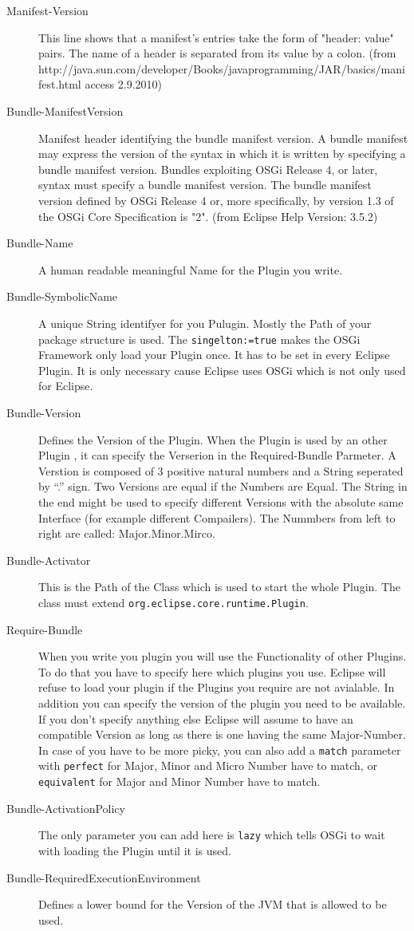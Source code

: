 \documentclass[a4paper,10pt]{report}
\begin{document}
\begin{description}
 \item[Manifest-Version] This line shows that a manifest's entries take the form of "header: value" pairs. The name of a header is separated from its value by a colon. (from http://java.sun.com/developer/Books/javaprogramming/JAR/basics/manifest.html access 2.9.2010)
 \item[Bundle-ManifestVersion] Manifest header identifying the bundle manifest version. A bundle manifest may express the version of the syntax in which it is written by specifying a bundle manifest version. Bundles exploiting OSGi Release 4, or later, syntax must specify a bundle manifest version. 
The bundle manifest version defined by OSGi Release 4 or, more specifically, by version 1.3 of the OSGi Core Specification is "2". (from Eclipse Help Version: 3.5.2)
 \item[Bundle-Name] A human readable meaningful Name for the Plugin you write.
 \item[Bundle-SymbolicName] A unique String identifyer for you Pulugin. Mostly the Path of your package structure is used. The \verb!singelton:=true! makes the OSGi Framework only load your Plugin once. It has to be set in every Eclipse Plugin. It is only necessary cause Eclipse uses OSGi which is not only used for Eclipse.
 \item[Bundle-Version] Defines the Version of the Plugin. When the Plugin is used by an other Plugin , it can specify the Verserion in the Required-Bundle Parmeter. A Verstion is composed of 3 positive natural numbers and a String seperated by ``.'' sign. Two Versions are equal if the Numbers are Equal. The String in the end might be used to specify different Versions with the absolute same Interface (for example different Compailers). The Nummbers from left to right are called: Major.Minor.Mirco.
 \item[Bundle-Activator] This is the Path of the Class which is used to start the whole Plugin. The class must extend \verb!org.eclipse.core.runtime.Plugin!. 
 \item[Require-Bundle] When you write you plugin you will use the Functionality of other Plugins. To do that you have to specify here which plugins you use. Eclipse will refuse to load your plugin if the Plugins you require are not avialable. In addition you can specify the version of the plugin you need to be available. If you don't specify anything else Eclipse will assume to have an compatible Version as long as there is one having the same Major-Number. In case of you have to be more picky, you can also add a \verb!match! parameter with \verb!perfect! for Major, Minor and Micro Number have to match, or \verb!equivalent! for Major and Minor Number have to match.
 \item[Bundle-ActivationPolicy] The only parameter you can add here is \verb!lazy! which tells OSGi to wait with loading the Plugin until it is used.
 \item[Bundle-RequiredExecutionEnvironment] Defines a lower bound for the Version of the JVM that is allowed to be used.
 \end{description}
\end{document}
